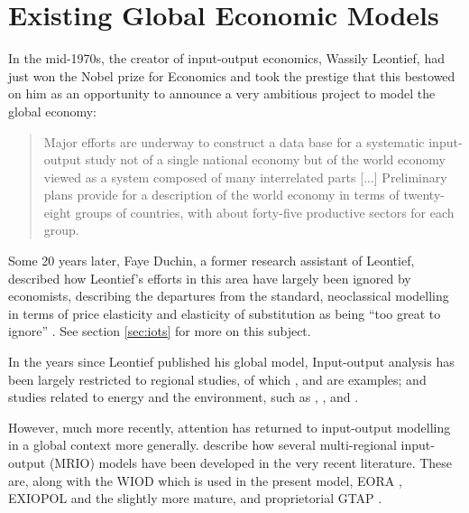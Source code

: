 \documentclass[a4paper]{article}
\begin{document}
\section{Existing Global Economic Models} \label{sec:litreview}
In the mid-1970s, the creator of input-output economics, Wassily Leontief, had just won the Nobel prize for Economics and took the prestige that this bestowed on him as an opportunity to announce a very ambitious project to model the global economy:

\begin{quotation}
Major efforts are underway to construct a data base for a systematic input-output study not of a single national economy but of the world economy viewed as a system composed of many interrelated parts [...]
Preliminary plans provide for a description of the world economy in terms of twenty-eight groups of countries, with about forty-five productive sectors for each group. 
\end{quotation}

Some 20 years later, Faye Duchin, a former research assistant of Leontief, described how Leontief's efforts in this area have largely been ignored by economists, describing the departures from the standard, neoclassical modelling in terms of price elasticity and elasticity of substitution as being ``too great to ignore'' \parencite{Duchin2004}. 
See section \ref{sec:iots} for more on this subject.

In the years since Leontief published his global model, Input-output analysis has been largely restricted to regional studies, of which \textcite{Akita1993}, \textcite{Khan1999} and \textcite{Luo2013a} are examples; and studies related to energy and the environment, such as  \textcite{Leontief1970}, \textcite{Joshi1999}, \textcite{Bergh2002} and \textcite{Hendrickson2006}.

However, much more recently, attention has returned to input-output modelling in a global context more generally. \textcite{Tukker2013} describe how several multi-regional input-output (MRIO) models have been developed in the very recent literature.
These are, along with the WIOD which is used in the present model, EORA \parencite{Lenzen2012}, EXIOPOL \parencite{Tukker2013a} and the slightly more mature, and proprietorial GTAP \parencite{Walmsley2012}.
\end{document}
